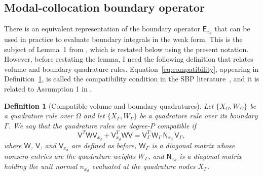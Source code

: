 \documentclass[pdflatex,sn-mathphys-num]{sn-jnl}%
\theoremstyle{thmstyleone}%
\theoremstyle{thmstyletwo}%
\theoremstyle{thmstylethree}%
\newtheorem{definition}{Definition}%
\newcommand{\mat}[1]{\ensuremath{\mathsf{#1}}}
\begin{document}
\subsection{Modal-collocation boundary operator}

There is an equivalent representation of the boundary operator $\mat{E}_{x_d}$ that can be used in practice to evaluate boundary integrals in the weak form.  This is the subject of Lemma~1 from \cite{Chan2018discretely}, which is restated below using the present notation.  However, before restating the lemma, I need the following definition that relates volume and boundary quadrature rules.  Equation~\eqref{eq:compatibility}, appearing in Definition~\ref{def:compatibility}, is called the compatibility condition in the SBP literature~\cite{Fernandez2014generalized}, and it is related to Assumption 1 in \cite{Chan2018discretely}.

\begin{definition}[Compatible volume and boundary quadratures]\label{def:compatibility}
    Let $\{X_\Omega, W_{\Omega}\}$ be a quadrature rule over $\Omega$ and let $\{X_\Gamma, W_{\Gamma}\}$ be a quadrature rule over its boundary $\Gamma$.  We say that the quadrature rules are degree-$P$ compatible if 
    \begin{equation}\label{eq:compatibility}
        \mat{V}^T \mat{W} \mat{V}_{x_d} + \mat{V}_{x_d}^T \mat{W} \mat{V}
        = \mat{V}_{\Gamma}^T\, \mat{W}_{\Gamma}\, \mat{N}_{x_d}\, \mat{V}_{\Gamma},
    \end{equation}
    where $\mat{W}$, $\mat{V}$, and $\mat{V}_{x_d}$ are defined as before, $\mat{W}_{\Gamma}$ is a diagonal matrix whose nonzero entries are the quadrature weights $W_{\Gamma}$, and $\mat{N}_{x_d}$ is a diagonal matrix holding the unit normal $n_{x_d}$ evaluated at the quadrature nodes $X_{\Gamma}$.
\end{definition}
\end{document}
